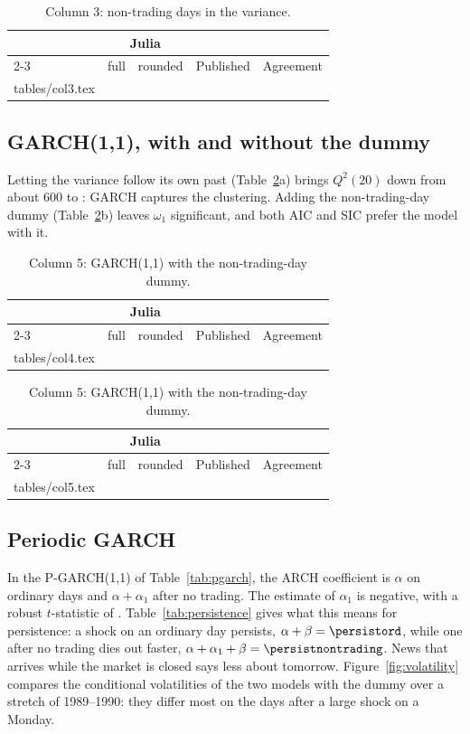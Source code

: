 \documentclass[11pt]{article}
\makeatletter
\newcommand{\rows}[1]{\@@input #1 }
\newenvironment{replication}{%
  \begin{tabular}{lrrrl}
  \toprule
  & \multicolumn{2}{c}{Julia} & & \\
  \cmidrule(lr){2-3}
  & full & rounded & Published & Agreement \\
  \midrule}{%
  \bottomrule
  \end{tabular}}
\makeatother
\begin{document}
\begin{table}[htbp]
  \ContinuedFloat
  \centering
  \caption{(continued)}
  \small
  \begin{subtable}{\textwidth}
    \centering
    \caption{Column 3: non-trading days in the variance.}
    \begin{replication}
    \rows{tables/col3.tex}
    \end{replication}
  \end{subtable}
\end{table}

\subsection{GARCH(1,1), with and without the dummy}

Letting the variance follow its own past (Table~\ref{tab:garch}a) brings $Q^2(20)$ down from about 600 to \qtwogarch: GARCH captures the clustering. Adding the non-trading-day dummy (Table~\ref{tab:garch}b) leaves $\omega_1$ significant, and both AIC and SIC prefer the model with it.

\begin{table}[htbp]
  \centering
  \caption{GARCH(1,1) models: Table~2, columns 4 and 5, of \citet[p.~146]{bollerslev1996periodic}. Standard errors are robust.}
  \label{tab:garch}
  \small
  \begin{subtable}{\textwidth}
    \centering
    \caption{Column 4: GARCH(1,1), fitted with ARCHModels.jl.}
    \begin{replication}
    \rows{tables/col4.tex}
    \end{replication}
  \end{subtable}

  \bigskip
  \begin{subtable}{\textwidth}
    \centering
    \caption{Column 5: GARCH(1,1) with the non-trading-day dummy.}
    \begin{replication}
    \rows{tables/col5.tex}
    \end{replication}
  \end{subtable}
\end{table}

\subsection{Periodic GARCH}

In the P-GARCH(1,1) of Table~\ref{tab:pgarch}, the ARCH coefficient is $\alpha$ on ordinary days and $\alpha + \alpha_1$ after no trading. The estimate of $\alpha_1$ is negative, with a robust $t$-statistic of \talphaone. Table~\ref{tab:persistence} gives what this means for persistence: a shock on an ordinary day persists, $\alpha + \beta = \persistord$, while one after no trading dies out faster, $\alpha + \alpha_1 + \beta = \persistnontrading$. News that arrives while the market is closed says less about tomorrow. Figure~\ref{fig:volatility} compares the conditional volatilities of the two models with the dummy over a stretch of 1989--1990: they differ most on the days after a large shock on a Monday.
\end{document}
